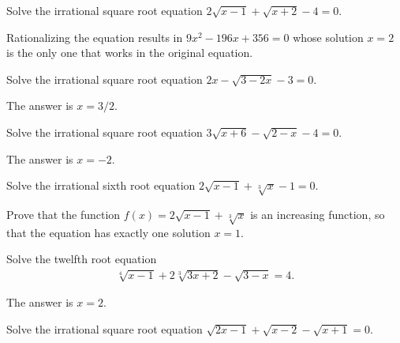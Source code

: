 \begin{question}\label{p:irrational-U}
    Solve the irrational square root equation $2\sqrt{x-1}+\sqrt{x+2}-4=0$.
\end{question}

\begin{solution}
    Rationalizing the equation results in $9x^2-196x+356=0$ whose solution $x=2$ is the only one that works in the original equation.
\end{solution}

\begin{question}\label{p:irrational-V}
    Solve the irrational square root equation $2x-\sqrt{3-2x}-3=0$.
\end{question}

\begin{solution}
    The answer is $x=3/2$.
\end{solution}

\begin{question}\label{p:irrational-W}
    Solve the irrational square root equation $3\sqrt{x+6}-\sqrt{2-x}-4=0$.
\end{question}


\begin{solution}
    The answer is $x=-2$.
\end{solution}


\begin{question}\label{p:irrational-X}
    Solve the irrational sixth root equation $2\sqrt{x-1}+\sqrt[3]{x}-1=0$.
\end{question}

\begin{solution}
    Prove that the function $f(x)=2\sqrt{x-1}+\sqrt[3]{x}$ is an increasing function, so that the equation has exactly one solution $x=1$. 
\end{solution}


\begin{question}\label{p:irrational-Y}
    Solve the twelfth root equation
    \begin{align*}
        \sqrt[4]{x-1}+2\sqrt[3]{3x+2}-\sqrt{3-x}=4.
    \end{align*}
\end{question}

\begin{solution}
    The answer is $x=2$.
\end{solution}

\begin{question}\label{p:irrational-Z}
    Solve the irrational square root equation $\sqrt{2x-1}+\sqrt{x-2}-\sqrt{x+1}=0$.
\end{question}


